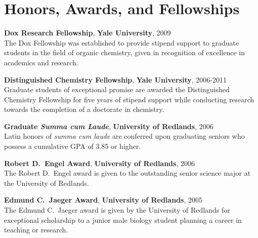 \documentclass[10pt]{article}
\newcommand*\eduitem[4]{\textbf{#1}, \textbf{#2}, #3\\#4}
\begin{document}
\section{Honors, Awards, and Fellowships}


\eduitem{Dox Research Fellowship}{Yale University}{2009}
{The Dox Fellowship was established to provide stipend support to graduate students 
in the field of organic chemistry, given in recognition of excellence in academics and research.}

\eduitem{Distinguished Chemistry Fellowship}{Yale University}{2006-2011}
{Graduate students of exceptional promise are awarded the Distinguished Chemistry Fellowship for five years of
stipend support while conducting research towards the completion of a doctorate in chemistry.}

\eduitem{Graduate \textit{Summa cum Laude}}{University of Redlands}{2006}
{Latin honors of \textit{summa cum laude} are conferred upon graduating seniors who possess a cumulative 
GPA of 3.85 or higher.}


\eduitem{Robert D.\ Engel Award}{University of Redlands}{2006}
{The Robert D.\ Engel award is given to the outstanding senior 
science major at the University of Redlands.}

\eduitem{Edmund C.\ Jaeger Award}{University of Redlands}{2005}
{The Edmund C.\ Jaeger award is given by the University of Redlands for exceptional scholarship 
to a junior male biology student planning a career in teaching or research.}


\end{document}
